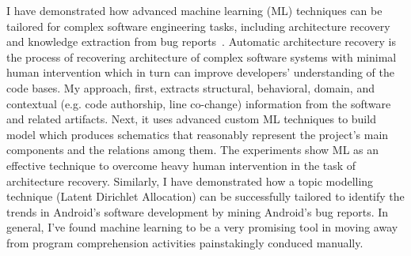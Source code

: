 \documentclass[a4paper]{article}
\begin{document}




I have demonstrated how advanced machine learning (ML) techniques can be tailored for complex software engineering tasks, including architecture recovery~\cite{archrecoveryicpc, archrecoveryisec} and knowledge extraction from bug reports~\cite{topicmodelling}. 
Automatic architecture recovery is the process of recovering architecture of complex software systems with minimal human intervention which in turn can
improve developers’ understanding of the code bases. My approach, first, extracts structural, behavioral, domain, and contextual (e.g. code
authorship, line co-change) information from the software and related artifacts. Next, it uses advanced custom ML techniques to build model which produces schematics that reasonably represent the
project’s main components and the relations among them. 
The experiments show ML as an effective technique to overcome heavy human intervention in the task of architecture recovery.  Similarly, I have demonstrated how a topic modelling technique (Latent Dirichlet Allocation) can be successfully tailored to identify the trends in Android’s software development by mining Android’s bug reports. In general, I've found machine learning to be a very promising tool in moving away from program comprehension activities painstakingly conduced manually.
\end{document}
